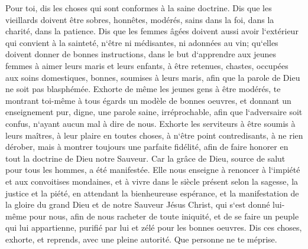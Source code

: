 \verse Pour toi, dis les choses qui sont conformes à la saine doctrine. 
\verse Dis que les vieillards doivent être sobres, honnêtes, modérés, sains dans la foi, dans la charité, dans la patience. 
\verse Dis que les femmes âgées doivent aussi avoir l`extérieur qui convient à la sainteté, n`être ni médisantes, ni adonnées au vin; qu`elles doivent donner de bonnes instructions, 
\verse dans le but d`apprendre aux jeunes femmes à aimer leurs maris et leurs enfants, 
\verse à être retenues, chastes, occupées aux soins domestiques, bonnes, soumises à leurs maris, afin que la parole de Dieu ne soit pas blasphémée. 
\verse Exhorte de même les jeunes gens à être modérés, 
\verse te montrant toi-même à tous égards un modèle de bonnes oeuvres, et donnant un enseignement pur, digne, 
\verse une parole saine, irréprochable, afin que l`adversaire soit confus, n`ayant aucun mal à dire de nous. 
\verse Exhorte les serviteurs à être soumis à leurs maîtres, à leur plaire en toutes choses, à n`être point contredisants, 
\verse à ne rien dérober, mais à montrer toujours une parfaite fidélité, afin de faire honorer en tout la doctrine de Dieu notre Sauveur. 
\verse Car la grâce de Dieu, source de salut pour tous les hommes, a été manifestée. 
\verse Elle nous enseigne à renoncer à l`impiété et aux convoitises mondaines, et à vivre dans le siècle présent selon la sagesse, la justice et la piété, 
\verse en attendant la bienheureuse espérance, et la manifestation de la gloire du grand Dieu et de notre Sauveur Jésus Christ, 
\verse qui s`est donné lui-même pour nous, afin de nous racheter de toute iniquité, et de se faire un peuple qui lui appartienne, purifié par lui et zélé pour les bonnes oeuvres. 
\verse Dis ces choses, exhorte, et reprends, avec une pleine autorité. Que personne ne te méprise. 

\chapter{}


